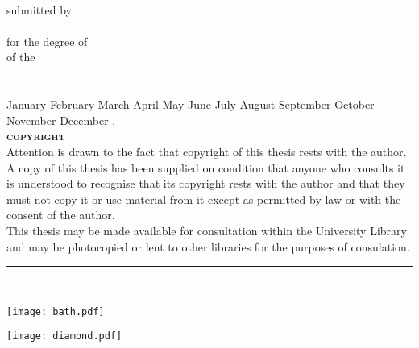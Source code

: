 \documentclass[
11pt, %
chapterinoneline,%
english, %
singlespacing, %
headsepline, %
]{MastersDoctoralThesis} %
\author{Andrew R. McCluskey} %
\newcommand{\MONTH}{%
	\ifcase\the\month
	\or January%
	\or February%
	\or March%
	\or April%
	\or May%
	\or June%
	\or July%
	\or August%
	\or September%
	\or October%
	\or November%
	\or December%
	\fi}
\begin{document}
\frontmatter %

\pagestyle{plain} %


\begin{titlepage}
\begin{center}
\doublespacing

{\huge \bfseries \ttitle}\\
\vspace{0.4cm} %
submitted by \\
\vspace{0.1cm}
\text{\huge \authorname} \\ 
\vspace{0.2cm}
for the degree of \degreename \\
\vspace{0.1cm}
of the \\
\vspace{0.2cm}
{\scshape\LARGE \univname} \\
\vspace{0.1cm}
\deptname \\
\vspace{0.5cm}
\MONTH, \the\year \\
\vspace{1.cm}
{\scshape \bfseries copyright} \\
Attention is drawn to the fact that copyright of this thesis rests with the author. A copy of this thesis has been supplied on condition that anyone who consults it is understood to recognise that its copyright rests with the author and that they must not copy it or use material from it except as permitted by law or with the consent of the author. \\
\vspace{0.5cm}
This thesis may be made available for consultation within the University Library and may be photocopied or lent to other libraries for the purposes of consulation.
\vspace{1.5cm} \\
\rule[0.5em]{25em}{0.5pt} \\
\vspace{1.cm}

\begin{minipage}[t][][b]{0.4\textwidth}
\begin{flushleft}
\texttt{[image: bath.pdf]}
\end{flushleft}
\end{minipage}
\begin{minipage}[t][][b]{0.4\textwidth}
\begin{flushright}
\texttt{[image: diamond.pdf]}
\end{flushright}
\end{minipage}\\[2cm]


\end{center}
\end{titlepage}
\end{document}
